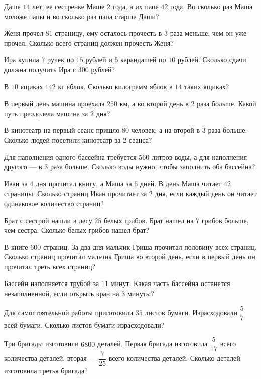 \begin{class}[number=8]
	\begin{listofex}
		\item Даше \( 14 \) лет, ее сестренке Маше \( 2 \) года, а их папе \( 42 \) года. Во сколько раз Маша моложе папы и во сколько раз папа старше Даши?
		\item Женя прочел \( 81 \) страницу, ему осталось прочесть в \( 3 \) раза меньше, чем он уже прочел. Сколько всего страниц должен прочесть Женя?
		\item Ира купила \( 7 \) ручек по \( 15 \) рублей и \( 5 \) карандашей по \( 10 \) рублей. Сколько сдачи должна получить Ира с \( 300 \) рублей?
		\item В \( 10 \) ящиках \( 142 \) кг яблок. Сколько килограмм яблок в \( 14 \) таких ящиках?
		\item В первый день машина проехала \( 250 \) км, а во второй день в \( 2 \) раза больше. Какой путь преодолела машина за \( 2 \) дня?
		\item В кинотеатр на первый сеанс пришло \( 80 \) человек, а на второй в \( 3 \) раза больше. Сколько людей посетили кинотеатр за \( 2 \) сеанса?
		\item Для наполнения одного бассейна требуется \( 560 \) литров воды, а для наполнения другого --- в \( 3 \) раза больше. Сколько воды нужно, чтобы заполнить оба бассейна?
		\item Иван за \( 4 \) дня прочитал книгу, а Маша за \( 6 \) дней. В день Маша читает \( 42 \) страницы. Сколько страниц Иван прочитает за \( 2 \) дня, если каждый день он читает одинаковое количество страниц?
		\item Брат с сестрой нашли в лесу \( 25 \) белых грибов. Брат нашел на \( 7 \) грибов больше, чем сестра. Сколько белых грибов нашел брат? 
		\item  В книге \( 600 \) страниц. За два дня мальчик Гриша прочитал половину всех страниц. Сколько страниц прочитал мальчик Гриша во второй день, если в первый день он прочитал треть всех страниц?
		\item Бассейн наполняется трубой за \( 11 \) минут. Какая часть бассейна останется незаполненной, если открыть кран на \( 3 \) минуты?
		\item Для самостоятельной работы приготовили \( 35 \) листов бумаги. Израсходовали \( \dfrac{5}{7} \) всей бумаги. Сколько листов бумаги израсходовали?
		\item Три бригады изготовили \( 6800 \) деталей. Первая бригада изготовила \( \dfrac{5}{17} \) всего количества деталей, вторая --- \( \dfrac{7}{25} \) всего количества деталей. Сколько деталей изготовила третья бригада?

\end{listofex}
\end{class}
